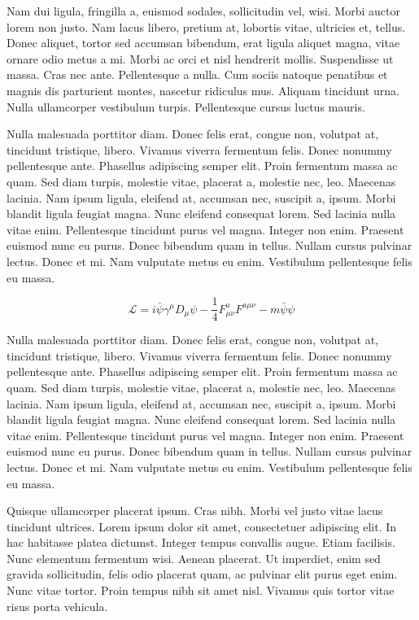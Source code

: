 \documentclass[AMA,STIX1COL]{WileyNJD-SP}
\begin{document}
Nam dui ligula, fringilla a, euismod sodales, sollicitudin vel, wisi. Morbi auctor lorem non justo. Nam lacus libero,
pretium at, lobortis vitae, ultricies et, tellus. Donec aliquet, tortor sed accumsan bibendum, erat ligula aliquet magna,
vitae ornare odio metus a mi. Morbi ac orci et nisl hendrerit mollis. Suspendisse ut massa. Cras nec ante. Pellentesque
a nulla. Cum sociis natoque penatibus et magnis dis parturient montes, nascetur ridiculus mus. Aliquam tincidunt
urna. Nulla ullamcorper vestibulum turpis. Pellentesque cursus luctus mauris.

Nulla malesuada porttitor diam. Donec felis erat, congue non, volutpat at, tincidunt tristique, libero. Vivamus
viverra fermentum felis. Donec nonummy pellentesque ante. Phasellus adipiscing semper elit. Proin fermentum massa
ac quam. Sed diam turpis, molestie vitae, placerat a, molestie nec, leo. Maecenas lacinia. Nam ipsum ligula, eleifend
at, accumsan nec, suscipit a, ipsum. Morbi blandit ligula feugiat magna. Nunc eleifend consequat lorem. Sed lacinia
nulla vitae enim. Pellentesque tincidunt purus vel magna. Integer non enim. Praesent euismod nunc eu purus. Donec
bibendum quam in tellus. Nullam cursus pulvinar lectus. Donec et mi. Nam vulputate metus eu enim. Vestibulum
pellentesque felis eu massa.


\begin{equation}
\mathcal{L} = i \bar{\psi} \gamma^\mu D_\mu \psi
    - \frac{1}{4} F_{\mu\nu}^a F^{a\mu\nu} - m \bar{\psi} \psi
\label{eq26}
\end{equation}

Nulla malesuada porttitor diam. Donec felis erat, congue non, volutpat at, tincidunt tristique, libero. Vivamus
viverra fermentum felis. Donec nonummy pellentesque ante. Phasellus adipiscing semper elit. Proin fermentum massa
ac quam. Sed diam turpis, molestie vitae, placerat a, molestie nec, leo. Maecenas lacinia. Nam ipsum ligula, eleifend
at, accumsan nec, suscipit a, ipsum. Morbi blandit ligula feugiat magna. Nunc eleifend consequat lorem. Sed lacinia
nulla vitae enim. Pellentesque tincidunt purus vel magna. Integer non enim. Praesent euismod nunc eu purus. Donec
bibendum quam in tellus. Nullam cursus pulvinar lectus. Donec et mi. Nam vulputate metus eu enim. Vestibulum
pellentesque felis eu massa.

Quisque ullamcorper placerat ipsum. Cras nibh. Morbi vel justo vitae lacus tincidunt ultrices. Lorem ipsum dolor sit
amet, consectetuer adipiscing elit. In hac habitasse platea dictumst. Integer tempus convallis augue. Etiam facilisis.
Nunc elementum fermentum wisi. Aenean placerat. Ut imperdiet, enim sed gravida sollicitudin, felis odio placerat
quam, ac pulvinar elit purus eget enim. Nunc vitae tortor. Proin tempus nibh sit amet nisl. Vivamus quis tortor
vitae risus porta vehicula.
\end{document}
